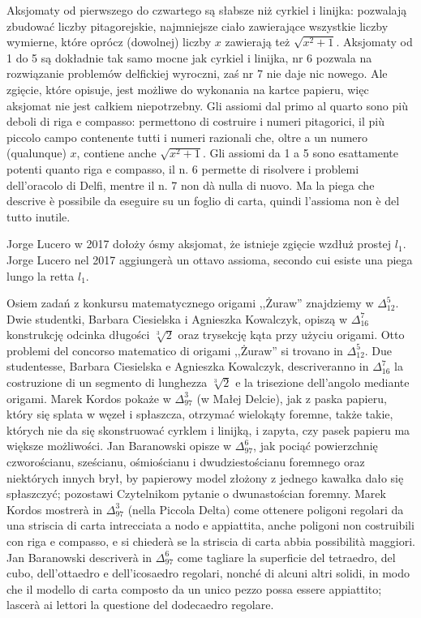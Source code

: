 Aksjomaty od pierwszego do czwartego są słabsze niż cyrkiel i linijka: pozwalają zbudować liczby pitagorejskie, najmniejsze ciało zawierające wszystkie liczby wymierne, które oprócz (dowolnej) liczby $x$ zawierają też $\sqrt{x^2 + 1}$. %
Aksjomaty od 1 do 5 są dokładnie tak samo mocne jak cyrkiel i linijka, nr 6 pozwala na rozwiązanie problemów delfickiej wyroczni, zaś nr 7 nie daje nic nowego. %
Ale zgięcie, które opisuje, jest możliwe do wykonania na kartce papieru, więc aksjomat nie jest całkiem niepotrzebny. %
Gli assiomi dal primo al quarto sono più deboli di riga e compasso: permettono di costruire i numeri pitagorici, il più piccolo campo contenente tutti i numeri razionali che, oltre a un numero (qualunque) $x$, contiene anche $\sqrt{x^2 + 1}$. %
Gli assiomi da 1 a 5 sono esattamente potenti quanto riga e compasso, il n. 6 permette di risolvere i problemi dell'oracolo di Delfi, mentre il n. 7 non dà nulla di nuovo. %
Ma la piega che descrive è possibile da eseguire su un foglio di carta, quindi l'assioma non è del tutto inutile. %

Jorge Lucero w 2017 dołoży ósmy aksjomat, że istnieje zgięcie wzdłuż prostej $l_1$. %
Jorge Lucero nel 2017 aggiungerà un ottavo assioma, secondo cui esiste una piega lungo la retta $l_1$. %
%

Osiem zadań z konkursu matematycznego origami ,,Żuraw'' znajdziemy w $\Delta_{12}^5$. %
Dwie studentki, Barbara Ciesielska i Agnieszka Kowalczyk, opiszą w $\Delta_{16}^7$ konstrukcję odcinka długości $\sqrt[3]{2}$ oraz trysekcję kąta przy użyciu origami. %
Otto problemi del concorso matematico di origami ,,Żuraw'' si trovano in $\Delta_{12}^5$. %
Due studentesse, Barbara Ciesielska e Agnieszka Kowalczyk, descriveranno in $\Delta_{16}^7$ la costruzione di un segmento di lunghezza $\sqrt[3]{2}$ e la trisezione dell'angolo mediante origami. %
Marek Kordos pokaże w $\Delta_{97}^3$ (w Małej Delcie), jak z paska papieru, który się splata w węzeł i spłaszcza, otrzymać wielokąty foremne, także takie, których nie da się skonstruować cyrklem i linijką, i zapyta, czy pasek papieru ma większe możliwości. %
Jan Baranowski opisze w $\Delta_{97}^6$, jak pociąć powierzchnię czworościanu, sześcianu, ośmiościanu i dwudziestościanu foremnego oraz niektórych innych brył, by papierowy model złożony z jednego kawałka dało się spłaszczyć; pozostawi Czytelnikom pytanie o dwunastościan foremny. %
Marek Kordos mostrerà in $\Delta_{97}^3$ (nella Piccola Delta) come ottenere poligoni regolari da una striscia di carta intrecciata a nodo e appiattita, anche poligoni non costruibili con riga e compasso, e si chiederà se la striscia di carta abbia possibilità maggiori. %
Jan Baranowski descriverà in $\Delta_{97}^6$ come tagliare la superficie del tetraedro, del cubo, dell'ottaedro e dell'icosaedro regolari, nonché di alcuni altri solidi, in modo che il modello di carta composto da un unico pezzo possa essere appiattito; lascerà ai lettori la questione del dodecaedro regolare. %


%
